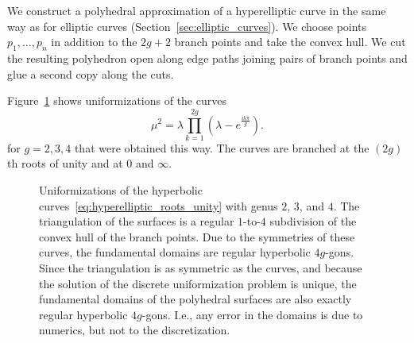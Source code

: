 \documentclass[Thesis]{subfiles}
\begin{document}
We construct a polyhedral approximation of a hyperelliptic curve in
the same way as for elliptic curves
(Section~\ref{sec:elliptic_curves}). We choose points
$p_{1},\ldots,p_{n}$ in addition to the $2g+2$ branch points and take
the convex hull. We cut the resulting polyhedron open along edge paths
joining pairs of branch points and glue a second copy along the cuts.

Figure~\ref{fig:roots_of_unity_curve} shows uniformizations of the curves
\begin{equation}
  \label{eq:hyperelliptic_roots_unity}
  \mu^2=\lambda\prod_{k=1}^{2g}\left(\lambda-e^{\frac{ik\pi}{g}}\right).
\end{equation}
for $g=2,3,4$ that were obtained this way. The curves
are branched at the $(2g)$th roots of unity and at $0$ and $\infty$.

\begin{figure} 
\centering
{}
\caption{ Uniformizations of the hyperbolic
  curves~\eqref{eq:hyperelliptic_roots_unity} with genus $2$, $3$, and
  $4$. The triangulation of the surfaces is a regular $1$-to-$4$
  subdivision of the convex hull of the branch points. Due to the
  symmetries of these curves, the fundamental domains are regular
  hyperbolic $4g$-gons. Since the triangulation is as symmetric as the
  curves, and because the solution of the discrete uniformization
  problem is unique, the fundamental domains of the polyhedral
  surfaces are also exactly regular hyperbolic $4g$-gons. I.e., any
  error in the domains is due to numerics, but not to the discretization.}
\label{fig:roots_of_unity_curve} 
\end{figure}
\end{document}
